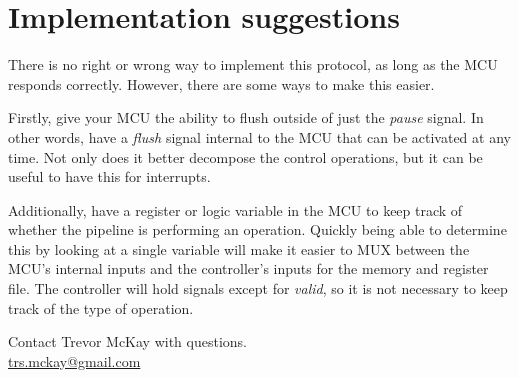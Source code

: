 \documentclass[10pt,a4paper]{article}
\begin{document}
\section{Implementation suggestions}
There is no right or wrong way to implement this protocol, as long as the MCU responds correctly.
However, there are some ways to make this easier.

Firstly, give your MCU the ability to flush outside of just the \emph{pause} signal.
In other words, have a \emph{flush} signal internal to the MCU that can be activated at any time.
Not only does it better decompose the control operations, but it can be useful to have this
for interrupts.

Additionally, have a register or logic variable in the MCU to keep track of whether the pipeline
is performing an operation. Quickly being able to determine this by looking at a single variable 
will make it easier to MUX between the MCU's internal inputs and the controller's inputs for
the memory and register file. The controller will hold signals except for \emph{valid}, so it is not
necessary to keep track of the type of operation.

\vspace*{\fill}
\begin{center}
    \noindent Contact Trevor McKay with questions.\\
    \href{mailto:trs.mckay@gmail.com}{trs.mckay@gmail.com}
\end{center}
\end{document}
